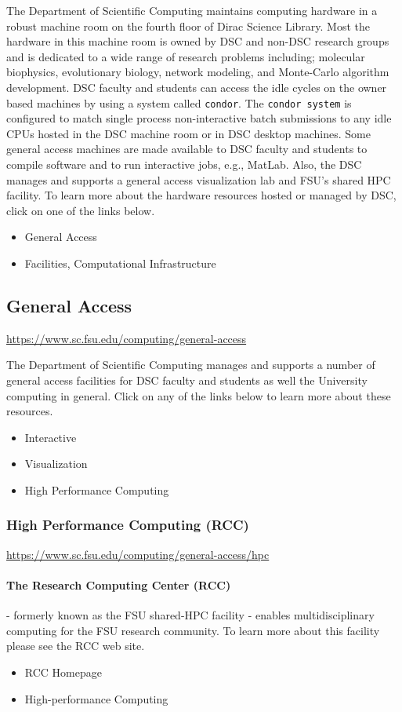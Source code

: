\documentclass[12pt,a4paper]{article}
\begin{document}
The Department of Scientific Computing maintains computing hardware in a robust machine room on the fourth floor of Dirac Science Library. Most the hardware in this machine room is owned by DSC and non-DSC research groups and is dedicated to a wide range of research problems including; molecular biophysics, evolutionary biology, network modeling, and Monte-Carlo algorithm development. DSC faculty and students can access the idle cycles on the owner based machines by using a system called \texttt{condor}. The \texttt{condor system} is configured to match single process non-interactive batch submissions to any idle CPUs hosted in the DSC machine room or in DSC desktop machines. Some general access machines are made available to DSC faculty and students to compile software and to run interactive jobs, e.g., MatLab. Also, the DSC manages and supports a general access visualization lab and FSU's shared HPC facility. To learn more about the hardware resources hosted or managed by DSC, click on one of the links below.
\begin{itemize}
    \item General Access
    \item Facilities, Computational Infrastructure
\end{itemize}

\subsection{General Access}
\url{https://www.sc.fsu.edu/computing/general-access}

The Department of Scientific Computing manages and supports a number of general access facilities for DSC faculty and students as well the University computing in general. Click on any of the links below to learn more about these resources.
\begin{itemize}
    \item Interactive
    \item Visualization
    \item High Performance Computing
\end{itemize}

\subsubsection{High Performance Computing (RCC)}
\url{https://www.sc.fsu.edu/computing/general-access/hpc}

\paragraph{The Research Computing Center (RCC)} - formerly known as the FSU shared-HPC facility - enables multidisciplinary computing for the FSU research community. To learn more about this facility please see the RCC web site.
\begin{itemize}
    \item RCC Homepage
    \item High-performance Computing
\end{itemize}
\end{document}
